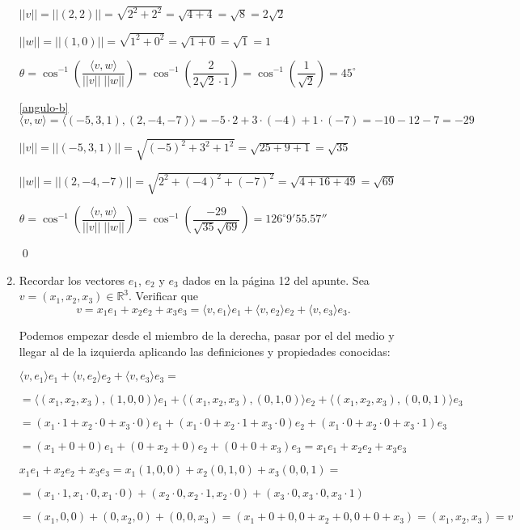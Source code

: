 \begin{enumerate}[topsep=6pt, itemsep=.4cm]
$||v||=||(2,2)|| = \sqrt{2^2 + 2^2} = \sqrt{4+4} = \sqrt{8} = 2 \sqrt{2}$

$||w||=||(1,0)|| = \sqrt{1^2 + 0 ^2} = \sqrt{1+0} = \sqrt{1} = 1 $

$\theta = \cos^{-1} \left( \dfrac{\langle v,w \rangle}{||v|| \; ||w||} \right) = \cos^{-1} \left( \dfrac{ 2 }{2\sqrt{2} \cdot 1 } \right) = \cos^{-1} \left( \dfrac{ 1 }{\sqrt{2}} \right) = \boxed{45^\circ}$

\ref{angulo-b} $\langle v , w  \rangle = \langle (-5,3,1) , (2,-4,-7)  \rangle = -5 \cdot 2 + 3 \cdot (-4) + 1 \cdot (-7) = -10 -12-7 = \boxed{-29}$

$||v||=||(-5,3,1)|| = \sqrt{(-5)^2 + 3^2 + 1^2} = \sqrt{25+9+1} = \sqrt{35}$

$||w||=||(2,-4,-7)|| = \sqrt{2^2 + (-4)^2 + (-7)^2} = \sqrt{4+16+49} = \sqrt{69}$

$\theta = \cos^{-1} \left( \dfrac{\langle v,w \rangle}{||v|| \; ||w||} \right) = \cos^{-1} \left( \dfrac{ -29 }{ \sqrt{35} \sqrt{69} } \right) = \boxed{126^\circ 9'55.57''}$

\qed

\item Recordar los vectores $e_1$, $e_2$ y $e_3$ dados en la página 12 del apunte. Sea $v=(x_1,x_2,x_3)\in\mathbb{R}^3$.  Verificar que 
$$v=x_1e_1+x_2e_2+x_3e_3=\langle v,e_1\rangle e_1+\langle v,e_2\rangle e_2+\langle v,e_3\rangle e_3.$$

\rta Podemos empezar desde el miembro de la derecha, pasar por el del medio y llegar al de la izquierda aplicando las definiciones y propiedades conocidas:

$ \langle v,e_1\rangle e_1+\langle v,e_2\rangle e_2+\langle v,e_3\rangle e_3 = $

$= \langle (x_1,x_2,x_3),(1,0,0)\rangle e_1+\langle (x_1,x_2,x_3),(0,1,0)\rangle e_2+\langle (x_1,x_2,x_3),(0,0,1)\rangle e_3 $

$= (x_1 \cdot 1 + x_2 \cdot 0 + x_3 \cdot 0) e_1+ (x_1 \cdot 0 + x_2 \cdot 1 + x_3 \cdot 0) e_2+ (x_1 \cdot 0 + x_2 \cdot 0 + x_3 \cdot 1) e_3 $

$= (x_1 + 0 + 0) e_1+ (0 + x_2 + 0) e_2+ (0 + 0 + x_3) e_3 = \boxed{x_1 e_1+ x_2 e_2 + x_3 e_3}$

$x_1 e_1+ x_2 e_2 + x_3 e_3 = x_1 (1,0,0) + x_2 (0,1,0) + x_3 (0,0,1) = $

$= (x_1 \cdot 1,x_1 \cdot 0,x_1 \cdot 0) + (x_2 \cdot 0, x_2 \cdot 1 , x_2 \cdot 0 ) + (x_3 \cdot 0 , x_3 \cdot 0 , x_3 \cdot 1) $

$= (x_1,0,0)+(0,x_2,0)+(0,0,x_3) = (x_1+0+0,0+x_2+0,0+0+x_3) = (x_1,x_2,x_3) = \boxed{v}$


\end{enumerate}

